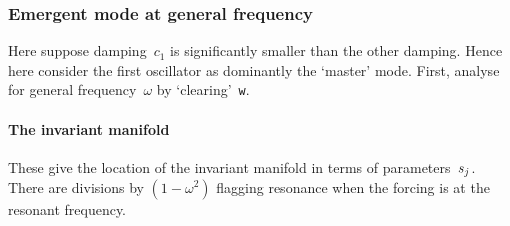 \subsubsection{Emergent mode at general frequency}

Here suppose damping~\(c_1\) is significantly smaller than the other damping.  Hence here consider the first oscillator as dominantly the `master' mode.  First, analyse for general frequency~\(\omega\) by `clearing'~\verb|w|.

\paragraph{The invariant manifold}
These give the location of the invariant manifold in
terms of parameters~\(s\sb j\).  There are divisions by \((1-\omega^2)\) flagging resonance when the forcing is at the resonant frequency.
